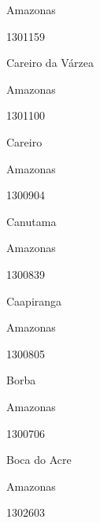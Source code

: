 \documentclass[
  letterpaper,
]{report}
\begin{document}
\n      

Amazonas

\n      

1301159

\n      

Careiro da Várzea

\n    

\n    

\n      

Amazonas

\n      

1301100

\n      

Careiro

\n    

\n    

\n      

Amazonas

\n      

1300904

\n      

Canutama

\n    

\n    

\n      

Amazonas

\n      

1300839

\n      

Caapiranga

\n    

\n    

\n      

Amazonas

\n      

1300805

\n      

Borba

\n    

\n    

\n      

Amazonas

\n      

1300706

\n      

Boca do Acre

\n    

\n    

\n      

Amazonas

\n      

1302603

\n      
\end{document}
